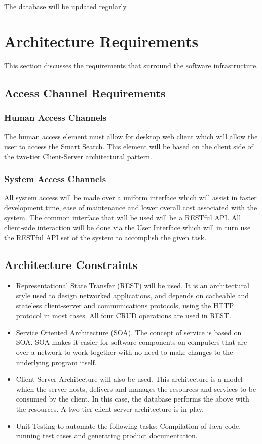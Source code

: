 \documentclass[a4paper,10pt]{article}
\begin{document}
	The database will be updated regularly.

	\newpage
	\section{Architecture Requirements}
	This section discusses the requirements that surround the software infrastructure.

	\subsection{Access Channel Requirements}
		\subsubsection{Human Access Channels}
	The human access element must allow for desktop web client which will allow the user to access the Smart Search.
	This element will be based on the client side of the two-tier Client-Server architectural pattern.

		\subsubsection{System Access Channels}
	All system access will be made over a uniform interface which will assist in faster development time, ease of maintenance and 		lower overall cost associated with the system. The common interface that will be used will be a RESTful API. All client-side 		interaction will be done via the User Interface which will in turn use the RESTful API set of the system to accomplish the given 	task.
	
	\subsection{Architecture Constraints}
	\begin{itemize}
		\item Representational State Transfer (REST) will be used. It is an architectural style used to design networked 	applications, and depends on cacheable and stateless client-server and communications protocols, using the HTTP protocol in most cases. All four CRUD operations are used in REST.
		\item Service Oriented Architecture (SOA). The concept of service is based on SOA. SOA makes it easier for software components on computers that are over a network to work together with no need to make changes to the underlying program itself. 
		\item Client-Server Architecture will also be used. This architecture is a model which the server hosts, delivers and manages the resources and services to be consumed by the client. In this case, the database performs the above with the resources. A two-tier client-server architecture is in play.
		\item Unit Testing to automate the following tasks: Compilation of Java code, running test cases and generating product documentation.
	\end{itemize}
	
\end{document}
